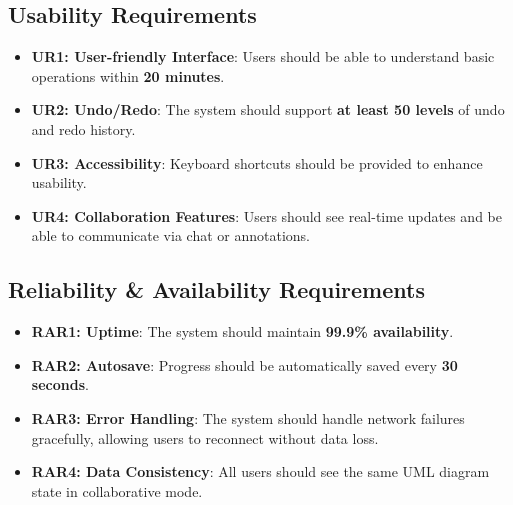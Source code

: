 \documentclass[12pt]{article}
\begin{document}
    \subsection{Usability Requirements}
    \begin{itemize}
        \item \textbf{UR1: User-friendly Interface}: Users should be able to understand basic operations within \textbf{20 minutes}.
        \item \textbf{UR2: Undo/Redo}: The system should support \textbf{at least 50 levels} of undo and redo history.
        \item \textbf{UR3: Accessibility}: Keyboard shortcuts should be provided to enhance usability.
        \item \textbf{UR4: Collaboration Features}: Users should see real-time updates and be able to communicate via chat or annotations.
    \end{itemize}

    \subsection{Reliability \& Availability Requirements}
    \begin{itemize}
        \item \textbf{RAR1: Uptime}: The system should maintain \textbf{99.9\% availability}.
        \item \textbf{RAR2: Autosave}: Progress should be automatically saved every \textbf{30 seconds}.
        \item \textbf{RAR3: Error Handling}: The system should handle network failures gracefully, allowing users to reconnect without data loss.
        \item \textbf{RAR4: Data Consistency}: All users should see the same UML diagram state in collaborative mode.
    \end{itemize}
\end{document}
